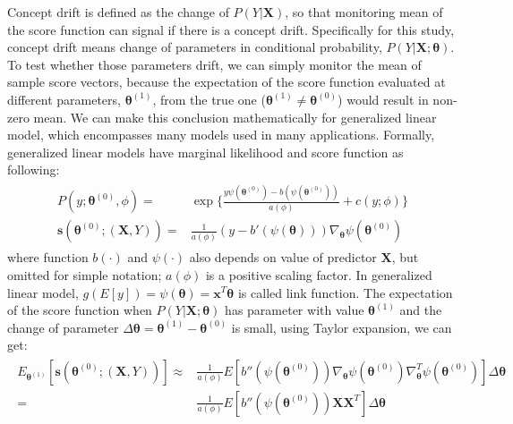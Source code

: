 \documentclass[twoside,11pt]{article}
\begin{document}
Concept drift is defined as the change of $ P (Y|\bm {X})$, so that monitoring mean of the score function can signal if there is a concept drift. Specifically for this study, concept drift means change of parameters in conditional probability, $P(Y|\bm {X}; \bm { \theta})$. To test whether those parameters drift, we can simply monitor the mean of sample score vectors, because the expectation of the score function evaluated at different parameters, $\bm { \theta} ^{ (1)}$, from the true one ($\bm { \theta} ^{ (1)} \neq \bm { \theta} ^{ (0)}$) would result in non-zero mean. We can make this conclusion mathematically for generalized linear model, which encompasses many models used in many applications. Formally, generalized linear models have marginal likelihood and score function as following:
\begin{align}
\begin{aligned}
P(y;\bm { \theta} ^{(0)}, \phi) =& \exp\{\frac{y \psi(\bm { \theta} ^{(0)})-b( \psi(\bm { \theta} ^{(0)}))}{ a ( \phi)} + c(y; \phi)\} \\
\bm {s}(\bm { \theta} ^{(0)};(\bm {X}, Y)) =& \frac{1}{a( \phi)}(y - b'( \psi (\bm { \theta})))\nabla _{ \bm { \theta}} \psi(\bm { \theta} ^{(0)})
\end{aligned}
\label{eqn:score_glm}
\end{align}
where function $b(\cdot)$ and $ \psi(\cdot)$ also depends on value of predictor $\bm { X}$, but omitted for simple notation; $ a ( \phi)$ is a positive scaling factor. In generalized linear model, $ g(E[y]) = \psi ( \bm { \theta})=\bm {x}^T\bm { \theta}$ is called link function. The expectation of the score function when $P(Y|\bm {X};\bm{\theta})$ has parameter with value $\bm { \theta} ^{(1)}$ and the change of parameter $ \Delta \bm { \theta}= \bm { \theta}^{(1)}-\bm { \theta}^{(0)}$ is small, using Taylor expansion, we can get:
\begin{align}
\begin{aligned}
E _{\bm { \theta} ^{(1)}}[\bm {s}(\bm { \theta} ^{(0)};(\bm {X}, Y))] \approx& \frac{1}{a ( \phi)}E[b''( \psi( \bm { \theta} ^{(0)}))\nabla _{ \bm { \theta}} \psi ( \bm { \theta} ^{ (0)}) \nabla _{ \bm { \theta}}^T \psi ( \bm { \theta} ^{ (0)})] \Delta \bm { \theta} \\
=& \frac{1}{a ( \phi)}E[b''( \psi( \bm { \theta} ^{(0)}))\bm {X}\bm {X}^T] \Delta \bm { \theta}
\end{aligned}
\label{eqn:exp_score_glm}
\end{align}
\end{document}
